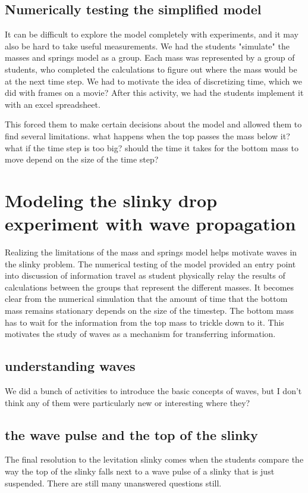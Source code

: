 \documentclass[aps,pre,10pt,superscriptaddress,showpacs,amsmath,amssymb,nofootinbib]{revtex4-1}
\begin{document}
\subsection{Numerically testing the simplified model}
It can be difficult to explore the model completely with experiments,  and it
may also be hard to take useful measurements.  We had the students "simulate"
the masses and springs model as a group. Each mass was represented by a group of
students, who completed the calculations to figure out where the mass would be
at the next time step.  We had to motivate the idea of discretizing time, which
we did with frames on a movie?  After this activity, we had the students
implement it with an excel spreadsheet.

This forced them to make certain decisions about the model and allowed them to
find several limitations.  what happens when the top passes the mass below it? 
what if the time step is too big?  should the time it takes for the bottom mass
to move depend on the size of the time step?


\section{Modeling the slinky drop experiment with wave propagation}

Realizing the limitations of the  mass and springs model helps motivate waves in
the slinky problem.  The numerical testing of the model provided an entry point
into discussion of information travel as student  physically relay the results
of calculations between the groups that represent the different masses.  It
becomes clear from the numerical simulation that the amount of time that the
bottom mass remains stationary depends on the size of the timestep.  The bottom
mass has to wait for the information from the top mass to trickle down to it. 
This motivates the study of waves as a mechanism for transferring information.

\subsection{understanding waves}
 We did a bunch of activities to introduce the basic concepts of waves, but I
 don't think any of them were particularly new or interesting where they?

\subsection{the wave pulse and the top of the slinky }
The final resolution to the levitation slinky comes when the students compare
the way the top of the slinky falls next to a wave pulse of a slinky that is
just suspended.  There are still many unanswered questions still.
\end{document}
